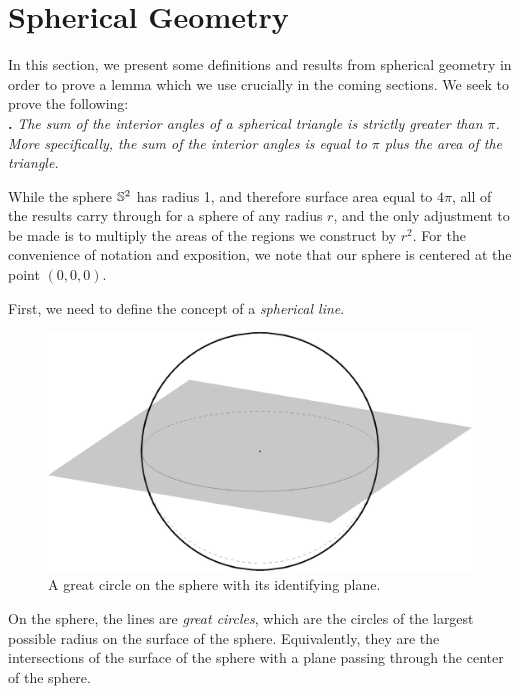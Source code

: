 \section{Spherical Geometry}
In this section, we present some definitions and results from spherical geometry in order to prove a lemma which we use crucially in the coming sections.  We seek to prove the following:\\

\noindent\textbf{.}
\emph{The sum of the interior angles of a spherical triangle is strictly greater than $\pi$.  More specifically, the sum of the interior angles is equal to $\pi$ plus the area of the triangle.}


While  the sphere $\mathbb{S}^2$ has radius 1, and therefore surface area equal to $4\pi$, all of the results carry through for a sphere of any radius $r$, and the only adjustment to be made is to multiply the areas of the regions we construct by $r^2$.  For the convenience of notation and exposition, we note that our sphere is centered at the point $(0,0,0)$.

First, we need to define the concept of a \textit{spherical line}.  


\begin{figure}[htb]
	\centering
	\includegraphics[width=.5\textwidth]{figs/sph-1pl.pdf}
	\caption{A great circle on the sphere with its identifying plane.}
	\label{fig:sphereline}
\end{figure}

\begin{definition}
On the sphere, the lines are \textit{great circles}, which are the circles of the largest possible radius on the surface of the sphere.  Equivalently, they are the intersections of the surface of the sphere with a plane passing through the center of the sphere.
\end{definition}  








